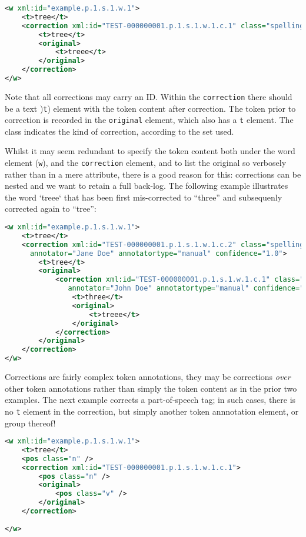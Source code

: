 \documentclass[a4paper,12pt]{report}
\begin{document}
\begin{lstlisting}[language=xml]
<w xml:id="example.p.1.s.1.w.1">
    <t>tree</t>
    <correction xml:id="TEST-000000001.p.1.s.1.w.1.c.1" class="spelling">
        <t>tree</t>
        <original>
            <t>treee</t>
        </original>
    </correction>
</w>
\end{lstlisting}

Note that all corrections may carry an ID. Within the \texttt{correction} there should be a text )\texttt{t}) element with the token content after correction. The token prior to correction is recorded in the \texttt{original} element, which also has a \texttt{t} element. The class indicates the kind of correction, according to the set used. 

Whilst it may seem redundant to specify the token content both under the word element (\texttt{w}), and the \texttt{correction} element, and to list the original so verbosely rather than in a mere attribute, there is a good reason for this: corrections can be nested and we want to retain a full back-log. The following example illustrates the word `treee` that has been first mis-corrected to ``three'' and subsequenly corrected again to ``tree'':

\begin{lstlisting}[language=xml]
<w xml:id="example.p.1.s.1.w.1">
    <t>tree</t>
    <correction xml:id="TEST-000000001.p.1.s.1.w.1.c.2" class="spelling" 
      annotator="Jane Doe" annotatortype="manual" confidence="1.0">
        <t>tree</t>
        <original>
            <correction xml:id="TEST-000000001.p.1.s.1.w.1.c.1" class="spelling"
               annotator="John Doe" annotatortype="manual" confidence="0.6">
                <t>three</t>
                <original>
                    <t>treee</t>
                </original>
            </correction>
        </original>
    </correction>
</w>
\end{lstlisting}

Corrections are fairly complex token annotations, they may be corrections \emph{over} other token annotations rather than simply the token content as in the prior two examples. The next example corrects a part-of-speech tag; in such cases, there is no \texttt{t} element in the correction, but simply another token annnotation element, or group thereof!

\begin{lstlisting}[language=xml]
<w xml:id="example.p.1.s.1.w.1">
    <t>tree</t>
    <pos class="n" />
    <correction xml:id="TEST-000000001.p.1.s.1.w.1.c.1">
        <pos class="n" />
        <original>
            <pos class="v" />
        </original>
    </correction>
    
</w>    
\end{lstlisting}
\end{document}
